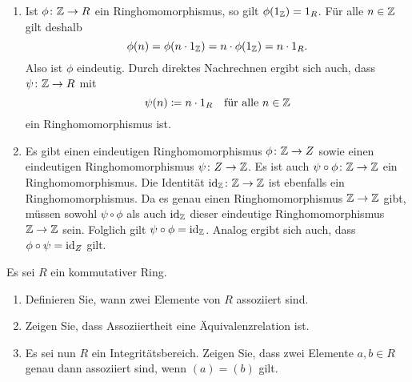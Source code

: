 \begin{solution}
  \begin{enumerate}
    \item
      Ist $\phi \colon \mathbb{Z} \to R$ ein Ringhomomorphismus, so gilt $\phi(1_{\mathbb{Z}}) = 1_R$.
      Für alle $n \in \mathbb{Z}$ gilt deshalb
      \[
          \phi(n)
        = \phi(n \cdot 1_{\mathbb{Z}})
        = n \cdot \phi(1_{\mathbb{Z}})
        = n \cdot 1_R.
      \]
      Also ist $\phi$ eindeutig.
      Durch direktes Nachrechnen ergibt sich auch, dass $\psi \colon \mathbb{Z} \to R$ mit
      \[
        \psi(n) \coloneqq n \cdot 1_R
        \quad
        \text{für alle $n \in \mathbb{Z}$}
      \]
      ein Ringhomomorphismus ist.
    \item
      Es gibt einen eindeutigen Ringhomomorphismus $\phi \colon \mathbb{Z} \to Z$ sowie einen eindeutigen Ringhomomorphismus $\psi \colon Z \to \mathbb{Z}$.
      Es ist auch $\psi \circ \phi \colon \mathbb{Z} \to \mathbb{Z}$ ein Ringhomomorphismus.
      Die Identität $\operatorname{id}_{\mathbb{Z}} \colon \mathbb{Z} \to \mathbb{Z}$ ist ebenfalls ein Ringhomomorphismus.
      Da es genau einen Ringhomomorphismus $\mathbb{Z} \to \mathbb{Z}$ gibt, müssen sowohl $\psi \circ \phi$ als auch $\operatorname{id}_{\mathbb{Z}}$  dieser eindeutige Ringhomomorphismus $\mathbb{Z} \to \mathbb{Z}$ sein.
      Folglich gilt $\psi \circ \phi = \operatorname{id}_{\mathbb{Z}}$.
      Analog ergibt sich auch, dass $\phi \circ \psi = \operatorname{id}_Z$ gilt.
  \end{enumerate}
\end{solution}


\begin{question}[subtitle = Assoziiertheit in Ringen]
  Es sei $R$ ein kommutativer Ring.
  \begin{enumerate}
    \item
      Definieren Sie, wann zwei Elemente von $R$ assoziiert sind.
    \item
      Zeigen Sie, dass Assoziiertheit eine Äquivalenzrelation ist.
    \item
      Es sei nun $R$ ein Integritätsbereich.
      Zeigen Sie, dass zwei Elemente $a, b \in R$ genau dann assoziiert sind, wenn $(a) = (b)$ gilt.
  \end{enumerate}
\end{question}


